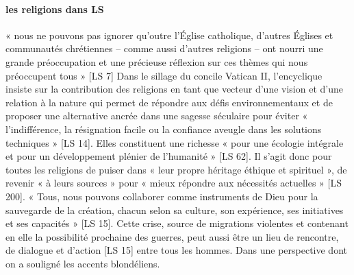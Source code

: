 \paragraph{les religions dans LS}    
 \begin{singlequote}
        « nous ne pouvons pas ignorer qu’outre l’Église catholique, d’autres Églises et communautés chrétiennes – comme aussi d’autres religions – ont nourri une grande préoccupation et une précieuse réflexion sur ces thèmes qui nous préoccupent tous » [LS 7]
        Dans le sillage du concile Vatican II, l’encyclique insiste sur la contribution des religions en tant que vecteur d’une vision et d’une relation à la nature qui permet de répondre aux défis environnementaux et de proposer une alternative ancrée dans une sagesse séculaire pour éviter « l’indifférence, la résignation facile ou la confiance aveugle dans les solutions techniques » [LS 14]. Elles constituent une richesse « pour une écologie intégrale et pour un développement plénier de l’humanité » [LS 62]. Il s’agit donc pour toutes les religions de puiser dans « leur propre héritage éthique et spirituel », de revenir « à leurs sources » pour « mieux répondre aux nécessités actuelles » [LS 200]. « Tous, nous pouvons collaborer comme instruments de Dieu pour la sauvegarde de la création, chacun selon sa culture, son expérience, ses initiatives et ses capacités » [LS 15]. Cette crise, source de migrations violentes et contenant en elle la possibilité prochaine des guerres, peut aussi être un lieu de rencontre, de dialogue et d’action [LS 15] entre tous les hommes. Dans une perspective dont on a souligné les accents blondéliens.
    \end{singlequote}       

 
 

    
